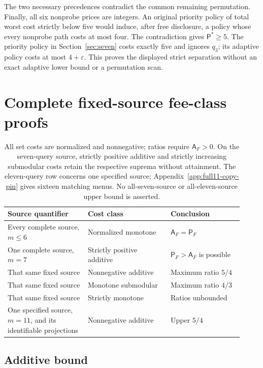 \documentclass[pdflatex,sn-mathphys-num]{sn-jnl}
\newcommand{\A}{\mathsf{A}}
\newcommand{\Pcost}{\mathsf{P}}
\theoremstyle{thmstyleone}
\theoremstyle{thmstylethree}
\theoremstyle{thmstyletwo}
\begin{document}
The two necessary precedences contradict the common remaining
permutation. Finally, all six nonprobe prices are integers. An original
priority policy of total worst cost strictly below five would induce,
after free disclosure, a policy whose every nonprobe path costs at most
four. The contradiction gives $\Pcost^*\ge5$. The priority policy in
Section~\ref{sec:seven} costs exactly five and ignores $q_3$; its adaptive
policy costs at most $4+\varepsilon$. This proves the displayed strict
separation without an exact adaptive lower bound or a permutation scan.

\section{Complete fixed-source fee-class proofs}\label{app:fixed-fee-proofs}
\begin{table}[ht]
\centering\small
\begin{tabular}{@{}>{\raggedright\arraybackslash}p{0.31\linewidth}p{0.32\linewidth}p{0.29\linewidth}@{}}\toprule
Source quantifier & Cost class & Conclusion\\\midrule
Every complete source, \mbox{$m\leq6$} & Normalized monotone & $\A_F=\Pcost_F$\\
One complete source, $m=7$ & Strictly positive additive & $\Pcost_F>\A_F$ is possible\\
That same fixed source & Nonnegative additive & Maximum ratio $5/4$\\
That same fixed source & Monotone submodular & Maximum ratio $4/3$\\
That same fixed source & Strictly monotone & Ratios unbounded\\
One specified source, \mbox{$m=11$}, and its identifiable projections & Nonnegative additive & Upper $5/4$\\\bottomrule
\end{tabular}
\caption{All set costs are normalized and nonnegative; ratios require $\A_F>0$. On the seven-query source, strictly positive additive and strictly increasing submodular costs retain the respective suprema without attainment. The eleven-query row concerns one specified source; Appendix~\ref{app:full11-copy-pin} gives sixteen matching menus. No all-seven-source or all-eleven-source upper bound is asserted.}\label{tab:scope}
\end{table}
\subsection{Additive bound}
\end{document}

